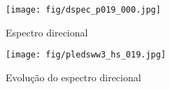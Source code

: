 \documentclass{article}
\begin{document}
\begin{figure}[H]
\begin{center}
\texttt{[image: fig/dspec\_p019\_000.jpg]} %
\caption{Espectro direcional}
\end{center}
\end{figure}

\begin{figure}[H]
\begin{center}
\texttt{[image: fig/pledsww3\_hs\_019.jpg]} %
\caption{Evolução do espectro direcional}
\end{center}
\end{figure}
\end{document}
